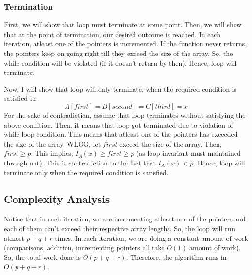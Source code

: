 \documentclass[12pt]{article}
\begin{document}
\subsubsection*{Termination}
First, we will show that loop must terminate at some point. Then, we will show that at the point of termination, our desired outcome is reached.
In each iteration, atleast one of the pointers is incremented. If the function never returns, the pointers keep on going right till they exceed the size of the array. So, the while condition will be violated (if it doesn't return by then). Hence, loop will terminate. 

Now, I will show that loop will only terminate, when the required condition is satisfied i.e $$A[first] = B[second] = C[third] = x$$
For the sake of contradiction, assume that loop terminates without satisfying the above condition. Then, it means that loop got terminated due to violation of while loop condition. This means that atleast one of the pointers has exceeded the size of the array. WLOG, let $first$ exceed the size of the array. Then, $first \geq p$. This implies, $I_A(x) \geq first \geq p$ (as loop invariant must maintained through out). This is contradiction to the fact that $I_A(x) < p$. Hence, loop will terminate only when the required condition is satisfied.

\subsection*{Complexity Analysis}
Notice that in each iteration, we are incrementing atleast one of the pointers and each of them can't exceed their respective array lengths. So, the loop will run atmost $p + q + r$ times. In each iteration, we are doing a constant amount of work (comparisons, addition, incrementing pointers all take $O(1)$ amount of work). So, the total work done is $O(p + q + r)$. Therefore, the algorithm runs in $O(p + q + r)$.
\end{document}
